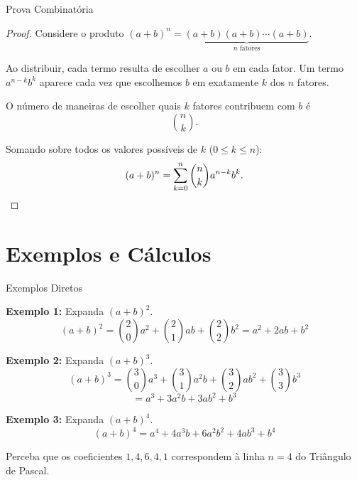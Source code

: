 \documentclass[9pt]{beamer}
\begin{document}

\begin{frame}{Prova Combinatória}

\begin{proof}
Considere o produto $(a+b)^n = \underbrace{(a+b)(a+b)\cdots(a+b)}_{n \text{ fatores}}$.

\vspace{0.2cm}

Ao distribuir, cada termo resulta de escolher $a$ ou $b$ em cada fator. Um termo $a^{n-k}b^k$ aparece cada vez que escolhemos $b$ em exatamente $k$ dos $n$ fatores.

\vspace{0.2cm}

O número de maneiras de escolher quais $k$ fatores contribuem com $b$ é
\[
\binom{n}{k}.
\]

\vspace{0.1cm}

Somando sobre todos os valores possíveis de $k$ ($0 \leq k \leq n$):
\[
(a+b)^n = \sum_{k=0}^{n} \binom{n}{k} a^{n-k} b^k. \qedhere
\]
\end{proof}
\end{frame}

\section{Exemplos e Cálculos}

\begin{frame}{Exemplos Diretos}

\textbf{Exemplo 1:} Expanda $(a+b)^2$.
\[
(a+b)^2 = \binom{2}{0}a^2 + \binom{2}{1}ab + \binom{2}{2}b^2 = a^2 + 2ab + b^2
\]

\vspace{0.3cm}

\textbf{Exemplo 2:} Expanda $(a+b)^3$.
\[
(a+b)^3 = \binom{3}{0}a^3 + \binom{3}{1}a^2b + \binom{3}{2}ab^2 + \binom{3}{3}b^3
\]
\[
= a^3 + 3a^2b + 3ab^2 + b^3
\]

\vspace{0.3cm}

\textbf{Exemplo 3:} Expanda $(a+b)^4$.
\[
(a+b)^4 = a^4 + 4a^3b + 6a^2b^2 + 4ab^3 + b^4
\]

\vspace{0.2cm}

Perceba que os coeficientes $1, 4, 6, 4, 1$ correspondem à linha $n=4$ do Triângulo de Pascal.
\end{frame}
\end{document}
